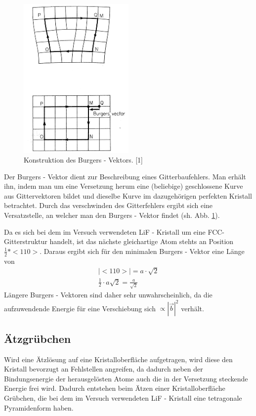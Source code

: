	\begin{figure}[H]
            \centering
            \includegraphics[width=0.5\textwidth]{Images/Burger.PNG}
            \caption{Konstruktion des Burgers - Vektors. [1]}
            \label{FigBurger}
        \end{figure}
	Der Burgers - Vektor dient zur Beschreibung eines Gitterbaufehlers. Man erhält ihn, indem man um eine Versetzung herum eine (beliebige) geschlossene Kurve aus
	Gittervektoren bildet und dieselbe Kurve im dazugehörigen perfekten Kristall betrachtet. Durch das verschwinden des Gitterfehlers ergibt sich eine Versatzstelle,
	an welcher man den Burgers - Vektor findet (sh. Abb. \ref{FigBurger}).

        Da es sich bei dem im Versuch verwendeten LiF - Kristall um eine FCC-Gitterstruktur handelt, ist das nächste gleichartige Atom stehts an Position $\frac{1}{2} * <110>$. Daraus ergibt sich für den minimalen
        Burgers - Vektor eine Länge von
        \begin{align}
            |<110>| = a \cdot \sqrt{2} \\
            \frac{1}{2} \cdot a\sqrt{2} = \frac{a}{\sqrt{2}}
        \end{align}
        Längere Burgers - Vektoren sind daher sehr unwahrscheinlich, da die aufzuwendende Energie für eine Verschiebung sich $\propto |\vec{b}|^2$ verhält.
            
    \subsection{Ätzgrübchen}
	Wird eine Ätzlösung auf eine Kristalloberfläche aufgetragen, wird diese den Kristall bevorzugt an Fehlstellen angreifen, da dadurch neben der Bindungsenergie der herausgelösten Atome auch
	die in der Versetzung steckende Energie frei wird. Dadurch entstehen beim Ätzen einer Kristalloberfläche Grübchen, die bei dem im Versuch verwendeten LiF - Kristall eine
	tetragonale Pyramidenform haben.

